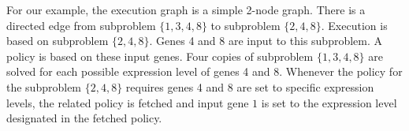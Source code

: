 For our example, the execution graph is a simple 2-node graph. There is a directed edge from subproblem $\{1,3,4,8\}$ to subproblem $\{2,4,8\}$. Execution is based on subproblem $\{2,4,8\}$. Genes 4 and 8 are input to this subproblem. A policy is based on these input genes. Four copies of subproblem $\{1,3,4,8\}$ are solved for each possible expression level of genes 4 and 8. Whenever the policy for the subproblem $\{2,4,8\}$ requires genes 4 and 8 are set to specific expression levels, the related policy is fetched and input gene $1$ is set to the expression level designated in the fetched policy.
